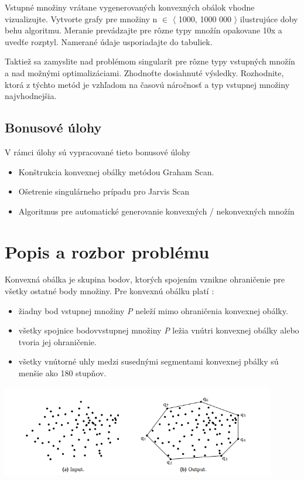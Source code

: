 \documentclass[12pt]{article}
\begin{document}
Vstupné množiny vrátane vygenerovaných konvexných obálok vhodne vizualizujte. Vytvorte grafy pre množiny n $\in$ $\langle$ 1000, 1000 000 $\rangle$ ilustrujúce doby behu algoritmu. Meranie prevádzajte pre rôzne typy množín opakovane 10x a uvedťe rozptyl. Namerané údaje usporiadajte do tabuliek.

Taktiež sa zamyslite nad problémom singularít pre rôzne typy vstupných množín a nad možnými optimalizáciami. Zhodnoťte dosiahnuté výsledky. Rozhodnite, ktorá z týchto metód je vzhľadom na časovú náročnosť a typ vstupnej množiny najvhodnejšia.

\subsection{Bonusové úlohy}
V rámci úlohy sú vypracované tieto bonusové úlohy

\begin{itemize}
\item Konštrukcia konvexnej obálky metódou Graham Scan.
\item Ošetrenie singulárneho prípadu pro Jarvis Scan
\item Algoritmus pre automatické generovanie konvexných / nekonvexných množín
\end{itemize}
\clearpage 
\section{Popis a rozbor problému}
Konvexná obálka je skupina bodov, ktorých spojením vznikne ohraničenie pre všetky ostatné body množiny. Pre konvexnú obálku platí : 

\begin{itemize}
\item žiadny bod vstupnej množiny \textit{P} neleží mimo ohraničenia konvexnej obálky.
\item všetky spojnice bodovvstupnej množiny \textit{P} ležia vnútri konvexnej obálky alebo tvoria jej ohraničenie.
\item všetky vnútorné uhly medzi susednými segmentami konvexnej pbálky sú menšie ako 180 stupňov.
\end{itemize}

\begin{center}
   \includegraphics[width=12cm]{./img/ch_obrazok1.png}
\end{center}
\end{document}
